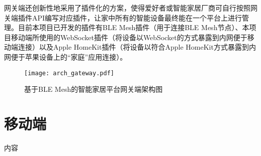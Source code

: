 网关端还创新性地采用了插件化的方案，使得爱好者或智能家居厂商可自行按照网关端插件API编写对应插件，让家中所有的智能设备最终能在一个平台上进行管理。目前本项目已开发的插件有BLE Mesh插件（用于连接BLE Mesh节点）、本项目移动端所使用的WebSocket插件（将设备以WebSocket的方式暴露到内网便于移动端连接）以及Apple HomeKit插件（将设备以符合Apple HomeKit方式暴露到内网便于苹果设备上的“家庭”应用连接）。
\begin{figure}[H]
    \centering
    \texttt{[image: arch\_gateway.pdf]}
    \caption{基于BLE Mesh的智能家居平台网关端架构图}
    \label{fig:arch}
\end{figure}

\section{移动端}
\label{design:mobile}
内容
